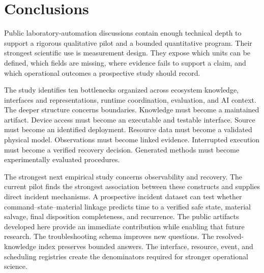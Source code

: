 \section{Conclusions}
\label{sec:conclusion}

Public laboratory-automation discussions contain enough technical depth to support a rigorous qualitative pilot and a bounded quantitative program. Their strongest scientific use is measurement design. They expose which units can be defined, which fields are missing, where evidence fails to support a claim, and which operational outcomes a prospective study should record.

The study identifies ten bottlenecks organized across ecosystem knowledge, interfaces and representations, runtime coordination, evaluation, and AI context. The deeper structure concerns boundaries. Knowledge must become a maintained artifact. Device access must become an executable and testable interface. Source must become an identified deployment. Resource data must become a validated physical model. Observations must become linked evidence. Interrupted execution must become a verified recovery decision. Generated methods must become experimentally evaluated procedures.

The strongest next empirical study concerns observability and recovery. The current pilot finds the strongest association between these constructs and supplies direct incident mechanisms. A prospective incident dataset can test whether command--state--material linkage predicts time to a verified safe state, material salvage, final disposition completeness, and recurrence. The public artifacts developed here provide an immediate contribution while enabling that future research. The troubleshooting schema improves new questions. The resolved-knowledge index preserves bounded answers. The interface, resource, event, and scheduling registries create the denominators required for stronger operational science.
